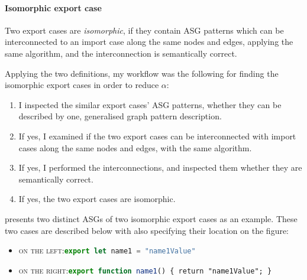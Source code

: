 \paragraph{Isomorphic export case}

Two export cases are \emph{isomorphic}, if they contain ASG patterns which can be interconnected to an import case along the same nodes and edges, applying the same algorithm, and the interconnection is semantically correct.

Applying the two definitions, my workflow was the following for finding the isomorphic export cases in order to reduce $\alpha$:

\begin{enumerate}
\item I inspected the similar export cases' ASG patterns, whether they can be described by one, generalised graph pattern description.
\item If yes, I examined if the two export cases can be interconnected with import cases along the same nodes and edges, with the same algorithm.
\item If yes, I performed the interconnections, and inspected them whether they are semantically correct.
\item If yes, the two export cases are isomorphic.
\end{enumerate}

 presents two distinct ASGs of two isomorphic export cases as an example. These two cases are described below with also specifying their location on the figure:
\begin{itemize}
\item \textsc{on the left:}\enskip\lstinline[language=JavaScript]{export let name1 = "name1Value"}
\item \textsc{on the right:}\enskip\lstinline[language=JavaScript]{export function name1()}\texttt{ \{ }\lstinline{return "name1Value";}\texttt{ \}}
\end{itemize}

